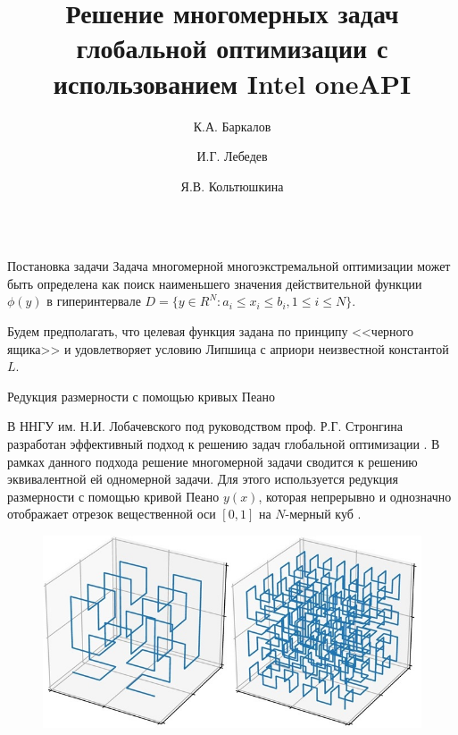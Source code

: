 \documentclass{beamer}
\title{Решение многомерных задач глобальной оптимизации с использованием Intel oneAPI }
\author{К.А. Баркалов \and И.Г. Лебедев \and Я.В. Кольтюшкина}
\institute{Нижегородский государственный университет им. Н.И. Лобачевского}
\begin{document}
\begin{frame}[t]
    \begin{columns}[t]
        \begin{column}[t]{0.47\paperwidth}
            \begin{block}{Постановка задачи}
             Задача многомерной многоэкстремальной оптимизации может быть определена как поиск наименьшего значения действительной функции \(\phi(y)\)  в гиперинтервале \(D=\{y\in R^N:a_i\leqslant x_i\leqslant{b_i}, 1\leqslant{i}\leqslant{N}\}\). 
             
             Будем предполагать, что целевая функция задана по принципу <<черного ящика>> и удовлетворяет условию Липшица с априори неизвестной константой \(L\). 

          \end{block}
          
          \begin{block}{Редукция размерности с помощью кривых Пеано}

В ННГУ им. Н.И. Лобачевского под руководством проф. Р.Г. Стронгина разработан эффективный подход к решению задач глобальной оптимизации \cite{Strongin2013}. В рамках данного подхода решение многомерной задачи сводится к решению эквивалентной ей одномерной задачи. Для этого используется редукция размерности с помощью кривой Пеано \(y(x)\), которая непрерывно и однозначно отображает отрезок вещественной оси \([0,1]\) на \(N\)-мерный куб \cite{Sergeyev2013}.

 \begin{minipage}[t]{.47\textwidth}
              \begin{figure}
                  \centering
                  \includegraphics[scale=1.49]{images/pean_2.jpg}
              \end{figure}
              \end{minipage}
              



\end{block}
\end{column}
\end{columns}
\end{frame}
\end{document}
